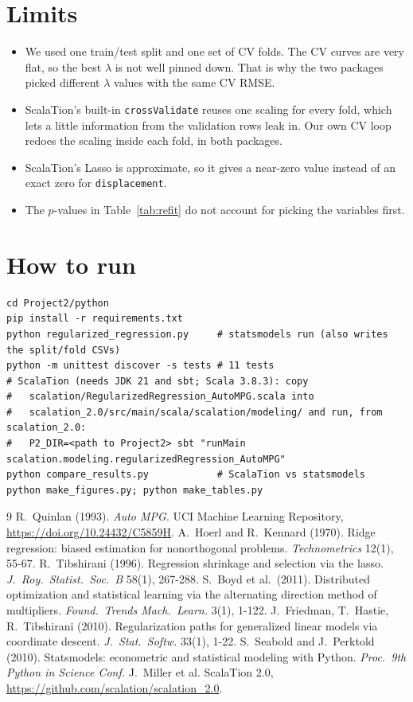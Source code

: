 \documentclass[11pt]{article}
\begin{document}
\section{Limits}
\begin{itemize}
\item We used one train/test split and one set of CV folds. The CV curves are very flat, so the best $\lambda$ is not well pinned down.
That is why the two packages picked different $\lambda$ values with the same CV RMSE.
\item ScalaTion's built-in \texttt{crossValidate} reuses one scaling for every fold, which lets a little information from the validation rows
leak in. Our own CV loop redoes the scaling inside each fold, in both packages.
\item ScalaTion's Lasso is approximate, so it gives a near-zero value instead of an exact zero for \texttt{displacement}.
\item The $p$-values in Table~\ref{tab:refit} do not account for picking the variables first.
\end{itemize}

\section{How to run}
{\footnotesize\begin{verbatim}
cd Project2/python
pip install -r requirements.txt
python regularized_regression.py     # statsmodels run (also writes the split/fold CSVs)
python -m unittest discover -s tests # 11 tests
# ScalaTion (needs JDK 21 and sbt; Scala 3.8.3): copy
#   scalation/RegularizedRegression_AutoMPG.scala into
#   scalation_2.0/src/main/scala/scalation/modeling/ and run, from scalation_2.0:
#   P2_DIR=<path to Project2> sbt "runMain scalation.modeling.regularizedRegression_AutoMPG"
python compare_results.py            # ScalaTion vs statsmodels
python make_figures.py; python make_tables.py
\end{verbatim}}

\begin{thebibliography}{9}\small
{} R.~Quinlan (1993). \emph{Auto MPG}. UCI Machine Learning Repository, \url{https://doi.org/10.24432/C5859H}.
 A.~Hoerl and R.~Kennard (1970). Ridge regression: biased estimation for nonorthogonal problems. \emph{Technometrics} 12(1), 55-67.
 R.~Tibshirani (1996). Regression shrinkage and selection via the lasso. \emph{J.\ Roy.\ Statist.\ Soc.\ B} 58(1), 267-288.
 S.~Boyd et al.\ (2011). Distributed optimization and statistical learning via the alternating direction method of multipliers. \emph{Found.\ Trends Mach.\ Learn.} 3(1), 1-122.
 J.~Friedman, T.~Hastie, R.~Tibshirani (2010). Regularization paths for generalized linear models via coordinate descent. \emph{J.\ Stat.\ Softw.} 33(1), 1-22.
 S.~Seabold and J.~Perktold (2010). Statsmodels: econometric and statistical modeling with Python. \emph{Proc.\ 9th Python in Science Conf.}
 J.~Miller et al. ScalaTion 2.0, \url{https://github.com/scalation/scalation_2.0}.
\end{thebibliography}
\end{document}

